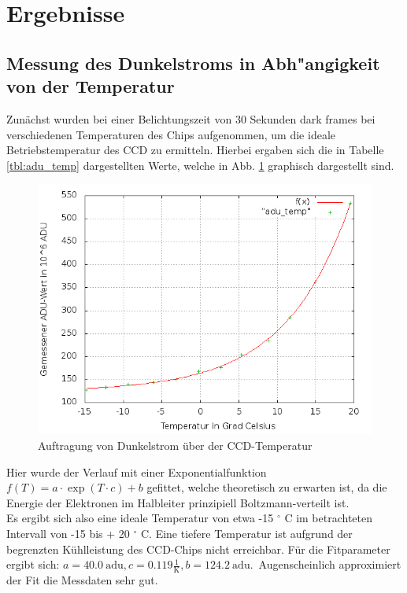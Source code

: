 \section{Ergebnisse}
\subsection{Messung des Dunkelstroms in Abh"angigkeit von der Temperatur}
Zunächst wurden bei einer Belichtungszeit von 30 Sekunden dark frames bei verschiedenen Temperaturen des Chips aufgenommen, um die ideale Betriebstemperatur des CCD zu ermitteln. Hierbei ergaben sich die in Tabelle \ref{tbl:adu_temp} dargestellten Werte, welche in Abb. \ref{fig:adu_temp} graphisch dargestellt sind. 
\begin{figure}[h!]
\centering
        \includegraphics[width=.9\textwidth]{plot_adu_temp2.png}
\caption{ Auftragung von Dunkelstrom über der CCD-Temperatur }
\label{fig:adu_temp}
\end{figure}
Hier wurde der Verlauf mit einer Exponentialfunktion $f(T) = a \cdot \exp(T \cdot c) + b$ gefittet, welche theoretisch zu erwarten ist, da die Energie der Elektronen im Halbleiter prinzipiell Boltzmann-verteilt ist. \\
Es ergibt sich also eine ideale Temperatur von etwa -15 $^\circ$ C im betrachteten Intervall von -15 bis + 20 $^\circ$ C. Eine tiefere Temperatur ist aufgrund der begrenzten Kühlleistung des CCD-Chips nicht erreichbar. Für die Fitparameter ergibt sich: 
$a = 40.0\  \mathrm{adu}, c = 0.119 \frac{1}{\mathrm{K}}, b = 124.2 \ \mathrm{adu}$.\
Augenscheinlich approximiert der Fit die Messdaten sehr gut.
